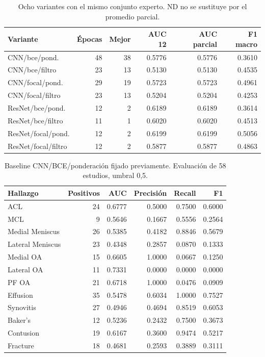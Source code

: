 \begin{table}[ht]
\centering\small
\caption{Ocho variantes con el mismo conjunto experto. ND no se sustituye por el promedio parcial.}
\begin{tabular}{lrrrrr}
\toprule
Variante & Épocas & Mejor & AUC 12 & AUC parcial & F1 macro \\
\midrule
CNN/bce/pond. & 48 & 38 & 0.5776 & 0.5776 & 0.3610 \\
CNN/bce/filtro & 23 & 13 & 0.5130 & 0.5130 & 0.4535 \\
CNN/focal/pond. & 29 & 19 & 0.5723 & 0.5723 & 0.4961 \\
CNN/focal/filtro & 23 & 13 & 0.5204 & 0.5204 & 0.4253 \\
ResNet/bce/pond. & 12 & 2 & 0.6189 & 0.6189 & 0.3614 \\
ResNet/bce/filtro & 11 & 1 & 0.6020 & 0.6020 & 0.4513 \\
ResNet/focal/pond. & 12 & 2 & 0.6199 & 0.6199 & 0.5056 \\
ResNet/focal/filtro & 12 & 2 & 0.5877 & 0.5877 & 0.4863 \\
\bottomrule
\end{tabular}
\end{table}
\begin{table}[ht]
\centering\small
\caption{Baseline CNN/BCE/ponderación fijado previamente. Evaluación de 58 estudios, umbral 0,5.}
\begin{tabular}{lrrrrr}
\toprule
Hallazgo & Positivos & AUC & Precisión & Recall & F1 \\
\midrule
ACL & 24 & 0.6777 & 0.5000 & 0.7500 & 0.6000 \\
MCL & 9 & 0.5646 & 0.1667 & 0.5556 & 0.2564 \\
Medial Meniscus & 26 & 0.5385 & 0.4182 & 0.8846 & 0.5679 \\
Lateral Meniscus & 23 & 0.4348 & 0.2857 & 0.0870 & 0.1333 \\
Medial OA & 15 & 0.6605 & 1.0000 & 0.0667 & 0.1250 \\
Lateral OA & 11 & 0.7331 & 0.0000 & 0.0000 & 0.0000 \\
PF OA & 21 & 0.6718 & 1.0000 & 0.0476 & 0.0909 \\
Effusion & 35 & 0.5478 & 0.6034 & 1.0000 & 0.7527 \\
Synovitis & 27 & 0.4946 & 0.4694 & 0.8519 & 0.6053 \\
Baker's & 12 & 0.5236 & 0.2432 & 0.7500 & 0.3673 \\
Contusion & 19 & 0.6167 & 0.3600 & 0.9474 & 0.5217 \\
Fracture & 18 & 0.4681 & 0.2593 & 0.3889 & 0.3111 \\
\bottomrule
\end{tabular}
\end{table}
